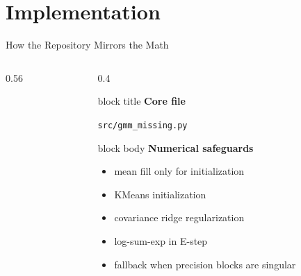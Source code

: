 \section{Implementation}

\begin{frame}[shrink=7]{How the Repository Mirrors the Math}
    \begin{columns}[T,onlytextwidth]
        \begin{column}{0.56\textwidth}
            
        \end{column}
        \begin{column}{0.4\textwidth}
            \begin{beamercolorbox}[sep=0.8em, rounded=true, shadow=true]{block title}
                \textbf{Core file}
            \end{beamercolorbox}
            \vspace{0.15cm}
            \texttt{src/gmm\_missing.py}

            \vspace{0.25cm}
            \small
            \begin{beamercolorbox}[sep=0.65em, rounded=true, shadow=true]{block body}
                \textbf{Numerical safeguards}
                \begin{itemize}
                    \item mean fill only for initialization
                    \item KMeans initialization
                    \item covariance ridge regularization
                    \item log-sum-exp in E-step
                    \item fallback when precision blocks are singular
                \end{itemize}
            \end{beamercolorbox}
        \end{column}
    \end{columns}
\end{frame}


